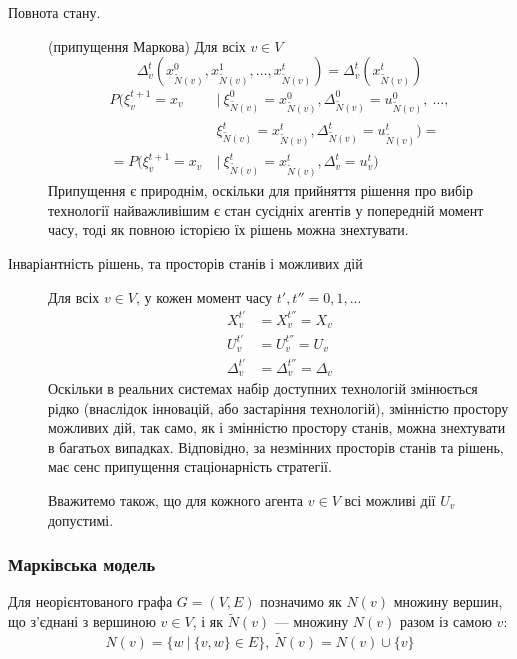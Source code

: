 \documentclass[oneside,14pt]{extarticle}
\begin{document}
\begin{description}
	\item[Повнота стану.] (припущення Маркова) Для всіх \(v \in V\)
	\[\Delta_v^{t}(x_{\tilde{N}(v)}^0, x_{\tilde{N}(v)}^1, \ldots, x_{\tilde{N}(v)}^t) = \Delta_v^{t}(x_{\tilde{N}(v)}^t)\]
	\begin{align*}
	P(\xi_v^{t+1} = x_v\ &|\ \xi_{\tilde N(v)}^0 = x_{\tilde N(v)}^0, \Delta_{\tilde N(v)}^0 = u_{\tilde N(v)}^0,\ \ldots,\\ &\xi_{\tilde N(v)}^t = x_{\tilde N(v)}^t, \Delta_{\tilde N(v)}^t = u_{\tilde N(v)}^t) = \\
	= P(\xi_v^{t+1} = x_v\ & |\ \xi_{\tilde N(v)}^t = x_{\tilde N(v)}^t, \Delta_v^t = u_v^t)
	\end{align*}
	Припущення є природнім, оскільки для прийняття рішення про вибір технології найважливішим є стан сусідніх агентів у попередній момент часу, тоді як повною історією їх рішень можна знехтувати.
	
    \item[Інваріантність рішень, та просторів станів і можливих дій] Для всіх \(v \in V\), у кожен момент часу \(t', t'' = 0, 1, ...\ \)
    \begin{align*}
      X_v^{t'} &= X_v^{t''} = X_v \\
      U_v^{t'} &= U_v^{t''} = U_v \\
	  \Delta_v^{t'} &= \Delta_v^{t''} = \Delta_v
    \end{align*}
	Оскільки в реальних системах набір доступних технологій змінюється рідко (внаслідок інновацій, або застаріння технологій), змінністю простору можливих дій, так само, як і змінністю простору станів, можна знехтувати в багатьох випадках. Відповідно, за незмінних просторів станів та рішень, має сенс припущення стаціонарність стратегії.
	
	Вважитемо також, що для кожного агента \(v \in V\) всі можливі дії \(U_v\) допустимі.

\end{description}







\subsubsection{Марківська модель}

Для неорієнтованого графа \(G = (V, E)\) позначимо як \(N(v)\) множину вершин, що з’єднані з вершиною \(v \in V\), і як \(\tilde{N}(v)\) — множину \(N(v)\) разом із самою \(v\):
\[N(v) = \{w\ |\ \{v, w\} \in E\},\ \tilde{N}(v) = N(v) \cup \{v\}\]
\end{document}
